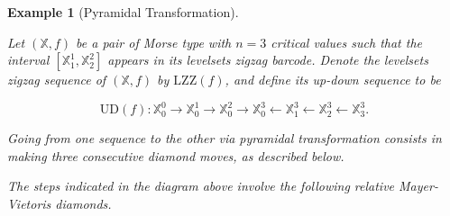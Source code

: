 \documentclass[11pt]{article}
\newtheorem{example}[theorem]{Example}
\theoremstyle{remark}
\newcommand{\X}{\mathbb{X}}
\begin{document}
\begin{example}[Pyramidal Transformation]
\label{traveling_example}

Let $(\X,f)$ be a pair of Morse type with $n=3$ critical values such that the interval $[\X_1^1,\X_2^2]$ appears in its levelsets zigzag barcode. Denote the levelsets zigzag sequence of $(\X,f)$ by $\mathrm{LZZ}(f)$, and define its up-down sequence to be

$$\mathrm{UD}(f):\X_0^0 \longrightarrow \X_0^1 \longrightarrow \X_0^2 \longrightarrow\X_0^3\longleftarrow\X_1^3\longleftarrow\X_2^3\longleftarrow\X_3^3.$$ 

\noindent Going from one sequence to the other via pyramidal transformation consists in making three consecutive diamond moves, as described below.

\begin{center}
\end{center}

\noindent The steps indicated in the diagram above involve the following relative Mayer-Vietoris diamonds.
\begin{center}
\end{center}


\end{example}
\end{document}
